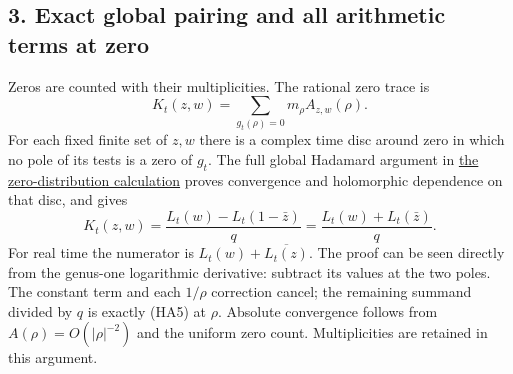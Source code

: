 \documentclass[
  10pt,
  a4paper,
]{article}
\begin{document}
\subsection{3. Exact global pairing and all arithmetic terms at
zero}\label{exact-global-pairing-and-all-arithmetic-terms-at-zero}

Zeros are counted with their multiplicities. The rational zero trace is
\[
K_t(z,w)=\sum_{g_t(\rho)=0}m_\rho A_{z,w}(\rho).
\tag{HA8}
\] For each fixed finite set of \(z,w\) there is a complex time disc
around zero in which no pole of its tests is a zero of \(g_t\). The full
global Hadamard argument in
\href{ACTUAL_HEAT_ZERO_DISTRIBUTION_VARIATION.md}{the zero-distribution
calculation} proves convergence and holomorphic dependence on that disc,
and gives \[
K_t(z,w)=\frac{L_t(w)-L_t(1-\bar z)}q
=\frac{L_t(w)+L_t(\bar z)}q.
\tag{HA9}
\] For real time the numerator is \(L_t(w)+\overline{L_t(z)}\). The
proof can be seen directly from the genus-one logarithmic derivative:
subtract its values at the two poles. The constant term and each
\(1/\rho\) correction cancel; the remaining summand divided by \(q\) is
exactly (HA5) at \(\rho\). Absolute convergence follows from
\(A(\rho)=O(|\rho|^{-2})\) and the uniform zero count. Multiplicities
are retained in this argument.
\end{document}
